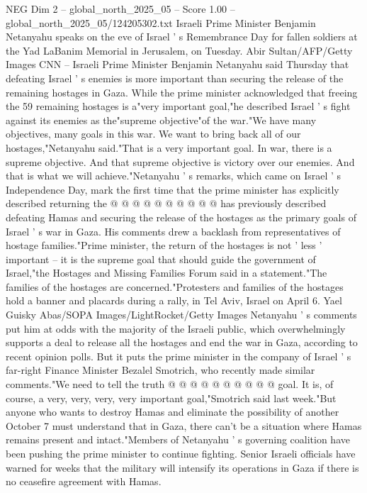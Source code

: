 \begin{textsample}{NEG Dim 2 – global\_north\_2025\_05 – Score 1.00 – global\_north\_2025\_05/124205302.txt}  \label{ex:f2_neg_038}
Israeli Prime Minister Benjamin Netanyahu speaks on the eve of Israel ' s Remembrance Day for fallen soldiers at the Yad LaBanim Memorial in Jerusalem, on Tuesday.
Abir Sultan/AFP/Getty Images CNN -- Israeli Prime Minister Benjamin Netanyahu said Thursday that defeating Israel ' s enemies is more important than securing the release of the remaining hostages in Gaza.
While the prime minister acknowledged that freeing the 59 remaining hostages is a"very important goal,"he described Israel ' s fight against its enemies as the"supreme objective"of the war."We have many objectives, many goals in this war.
We want to bring back all of our hostages,"Netanyahu said."That is a very important goal.
In war, there is a supreme objective.
And that supreme objective is victory over our enemies.
And that is what we will achieve."Netanyahu ' s remarks, which came on Israel ' s Independence Day, mark the first time that the prime minister has explicitly described returning the @ @ @ @ @ @ @ @ @ @ has previously described defeating Hamas and securing the release of the hostages as the primary goals of Israel ' s war in Gaza.
His comments drew a backlash from representatives of hostage families."Prime minister, the return of the hostages is not ' less ' important -- it is the supreme goal that should guide the government of Israel,"the Hostages and Missing Families Forum said in a statement."The families of the hostages are concerned."Protesters and families of the hostages hold a banner and placards during a rally, in Tel Aviv, Israel on April 6.
Yael Guisky Abas/SOPA Images/LightRocket/Getty Images Netanyahu ' s comments put him at odds with the majority of the Israeli public, which overwhelmingly supports a deal to release all the hostages and end the war in Gaza, according to recent opinion polls.
But it puts the prime minister in the company of Israel ' s far-right Finance Minister Bezalel Smotrich, who recently made similar comments."We need to tell the truth @ @ @ @ @ @ @ @ @ @ goal.
It is, of course, a very, very, very, very important goal,"Smotrich said last week."But anyone who wants to destroy Hamas and eliminate the possibility of another October 7 must understand that in Gaza, there can't be a situation where Hamas remains present and intact."Members of Netanyahu ' s governing coalition have been pushing the prime minister to continue fighting.
Senior Israeli officials have warned for weeks that the military will intensify its operations in Gaza if there is no ceasefire agreement with Hamas.

\end{textsample}
